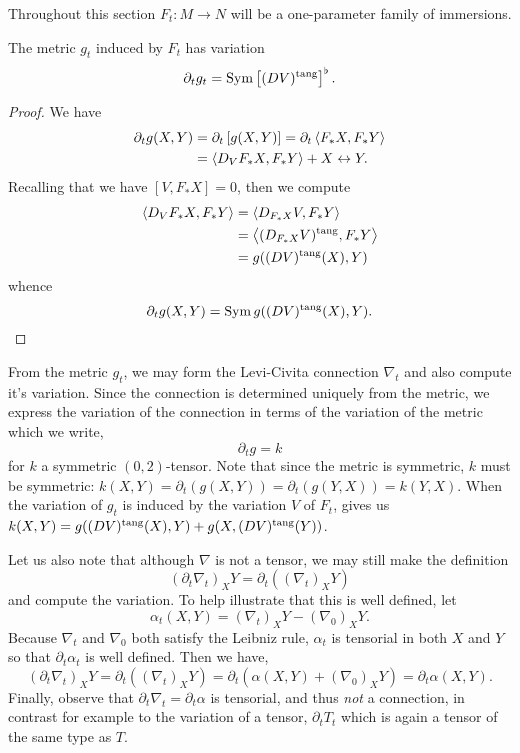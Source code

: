Throughout this section \(F_t : M \to N\) will be a one-parameter family of immersions.

\begin{lemma}
\label{lem:dt_g}
The metric \(g_t\) induced by \(F_t\) has variation
\[
\partial_t g_t = \operatorname{Sym} \left[(DV)^{\operatorname{tang}}\right]^{\flat}.
\]
\end{lemma}

\begin{proof}
We have
\[
\begin{split}
\partial_t g (X, Y) &= \partial_t \left[g(X, Y)\right] = \partial_t \left\langle F_{\ast} X,F_{\ast} Y \right\rangle \\
&= \left\langle D_V F_{\ast} X,F_{\ast} Y \right\rangle + X \leftrightarrow Y.
\end{split}
\]
Recalling that we have \([V, F_{\ast} X] = 0\), then we compute
\[
\begin{split}
\left\langle D_V F_{\ast} X,F_{\ast} Y \right\rangle &= \left\langle D_{F_{\ast} X} V,F_{\ast} Y \right\rangle \\
&= \left\langle (D_{F_{\ast} X} V)^{\operatorname{tang}},F_{\ast} Y \right\rangle \\
&= g((DV)^{\operatorname{tang}} (X), Y)
\end{split}
\]
whence
\[
\partial_t g (X, Y) = \operatorname{Sym} g((DV)^{\operatorname{tang}} (X), Y).
\]
\end{proof}

From the metric \(g_t\), we may form the Levi-Civita connection \(\nabla_t\) and also compute it's variation. Since the connection is determined uniquely from the metric, we express the variation of the connection in terms of the variation of the metric which we write,
\[
\partial_t g = k
\]
for \(k\) a symmetric \((0, 2)\)-tensor. Note that since the metric is symmetric, \(k\) must be symmetric: \(k(X, Y) = \partial_t (g(X, Y)) = \partial_t (g(Y, X)) = k(Y, X)\). When the variation of \(g_t\) is induced by the variation \(V\) of \(F_t\),  gives us \(k(X, Y) = g((DV)^{\operatorname{tang}} (X), Y) + g(X, (DV)^{\operatorname{tang}} (Y))\).

\begin{rem}
Let us also note that although \(\nabla\) is not a tensor, we may still make the definition
\[
(\partial_t \nabla_t)_X Y = \partial_t((\nabla_t)_X Y)
\]
and compute the variation. To help illustrate that this is well defined, let
\[
\alpha_t(X, Y) = (\nabla_{t})_X Y - (\nabla_{0})_X Y.
\]
Because \(\nabla_t\) and \(\nabla_0\) both satisfy the Leibniz rule, \(\alpha_t\) is tensorial in both \(X\) and \(Y\) so that \(\partial_t \alpha_t\) is well defined. Then we have,
\[
(\partial_t \nabla_t)_X Y = \partial_t((\nabla_t)_X Y) = \partial_t (\alpha(X, Y) + (\nabla_{0})_X Y) = \partial_t \alpha (X, Y).
\]
Finally, observe that \(\partial_t \nabla_t = \partial_t \alpha\) is tensorial, and thus \emph{not} a connection, in contrast for example to the variation of a tensor, \(\partial_t T_t\) which is again a tensor of the same type as \(T\).
\end{rem}

